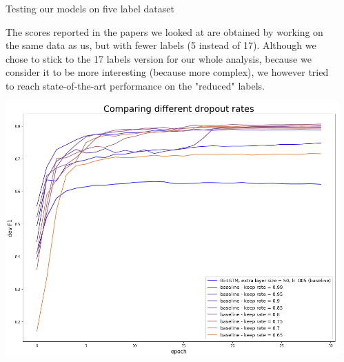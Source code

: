 \documentclass[final]{beamer}
\newlength{\onecolwid}
\newlength{\twocolwid}
\begin{document}
\begin{frame}[t]
\begin{columns}[t]
\begin{column}{\twocolwid}
\begin{columns}[t,totalwidth=\twocolwid] %

\begin{column}{\onecolwid} %


\begin{block}{Testing our models on five label dataset}

The scores reported in the papers we looked at are obtained by working on the same data as us, but with fewer labels (5 instead of 17). Although we chose to stick to the 17 labels version for our whole analysis, because we consider it to be more interesting (because more complex), we however tried to reach state-of-the-art performance on the "reduced" labels.

\begin{center}
\includegraphics[scale=0.6]{figs/dr_devf1.png}
\end{center}

\end{block}


\end{column} %

\begin{column}{\onecolwid} %


\end{column}
\end{columns}
\end{column}
\end{columns}
\end{frame}
\end{document}
